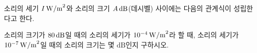 소리의 세기 $I\mkern3mu \mathrm{W/m}^{2}$와 소리의 크기 $A\mkern3mu \mathrm{dB}$(데시벨) 사이에는 다음의 관계식이 성립한다고 한다. \par\smallskip{}\par\smallskip\noindent 소리의 크기가 $80\mkern3mu \mathrm{dB}$일 때의 소리의 세기가 $10^{-4}\mkern3mu \mathrm{W/m}^{2}$라 할 때, 소리의 세기가 $10^{-7}\mkern3mu \mathrm{W/m}^{2}$일 때의 소리의 크기는 몇 $\mathrm{dB}$인지 구하시오.
